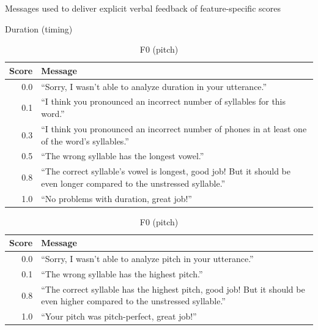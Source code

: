 		
		\begin{table}[p]
			\centering
			\caption{Messages used to deliver explicit verbal feedback of feature-specific scores}
			
			\begin{subtable}{\textwidth}
				\centering
				\caption{Duration (timing)}
				\begin{tabularx}{\textwidth}{rX}
					\toprule
					Score & Message \\
					\midrule 
					 0.0 & ``Sorry, I wasn't able to analyze duration in your utterance.'' \\
					 0.1 & ``I think you pronounced an incorrect number of syllables for this word.'' \\
					0.3 & ``I think you pronounced an incorrect number of phones in at least one of the word's syllables.'' \\
					0.5 & ``The wrong syllable has the longest vowel.'' \\
					0.8 & ``The correct syllable's vowel is longest, good job! But it should be even longer compared to the unstressed syllable.'' \\
					1.0 & ``No problems with duration, great job!'' \\
		
					\bottomrule
				\end{tabularx}
				\label{tab:explicit:messages:dur}
			\end{subtable}	
			
			\vspace{1.5em}			
			
			\begin{subtable}{\textwidth}
				\centering
				\caption{F0 (pitch)}
				\begin{tabularx}{\textwidth}{rX}
					\toprule
					Score & Message \\
					\midrule 
					 0.0 & ``Sorry, I wasn't able to analyze pitch in your utterance.'' \\
					 0.1 & ``The wrong syllable has the highest pitch.'' \\
					0.8 & ``The correct syllable has the highest pitch, good job! But it should be even higher compared to the unstressed syllable.'' \\
					1.0 & ``Your pitch was pitch-perfect, great job!'' \\
					\bottomrule
				\end{tabularx}
				\label{tab:explicit:messages:f0}
			\end{subtable}	
			

\end{table}
